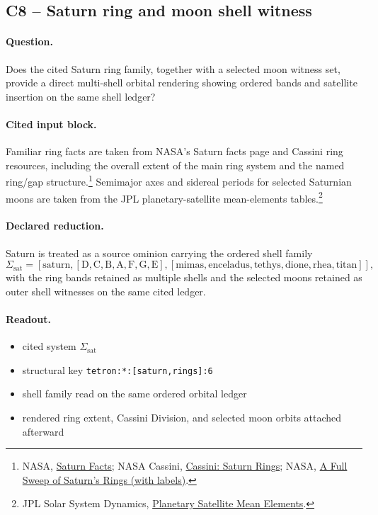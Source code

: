 \subsection{C8 -- Saturn ring and moon shell witness}\label{app:c8}
\paragraph{Question.} Does the cited Saturn ring family, together with a selected moon witness set, provide a direct multi-shell orbital rendering showing ordered bands and satellite insertion on the same shell ledger?

\paragraph{Cited input block.} Familiar ring facts are taken from NASA's Saturn facts page and Cassini ring resources, including the overall extent of the main ring system and the named ring/gap structure.\footnote{NASA, \href{https://science.nasa.gov/saturn/facts/}{Saturn Facts}; NASA Cassini, \href{https://science.nasa.gov/mission/cassini/science/rings/}{Cassini: Saturn Rings}; NASA, \href{https://science.nasa.gov/resource/a-full-sweep-of-saturns-rings-with-labels/}{A Full Sweep of Saturn's Rings (with labels)}.} Semimajor axes and sidereal periods for selected Saturnian moons are taken from the JPL planetary-satellite mean-elements tables.\footnote{JPL Solar System Dynamics, \href{https://ssd.jpl.nasa.gov/sats/elem/}{Planetary Satellite Mean Elements}.}

\paragraph{Declared reduction.} Saturn is treated as a source ominion carrying the ordered shell family
\[
\Sigma_{\mathrm{sat}} = [\mathrm{saturn},[\mathrm{D},\mathrm{C},\mathrm{B},\mathrm{A},\mathrm{F},\mathrm{G},\mathrm{E}],[\mathrm{mimas},\mathrm{enceladus},\mathrm{tethys},\mathrm{dione},\mathrm{rhea},\mathrm{titan}]],
\]
with the ring bands retained as multiple shells and the selected moons retained as outer shell witnesses on the same cited ledger.

\paragraph{Readout.}
\begin{itemize}
\item cited system $\Sigma_{\mathrm{sat}}$
\item structural key \texttt{tetron:*:[saturn,rings]:6}
\item shell family read on the same ordered orbital ledger
\item rendered ring extent, Cassini Division, and selected moon orbits attached afterward
\end{itemize}

